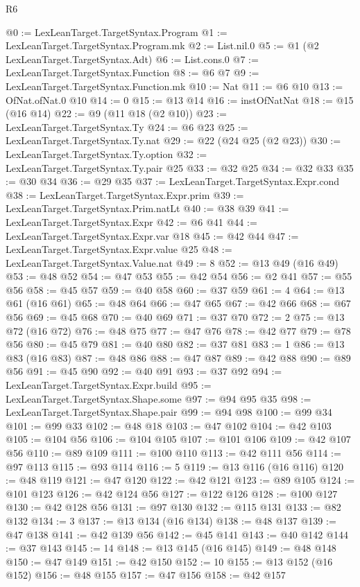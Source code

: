 \begin{lexlean}{R6}
\begin{coremodule}
@0 := LexLeanTarget.TargetSyntax.Program
@1 := LexLeanTarget.TargetSyntax.Program.mk
@2 := List.nil.{0}
@5 := @1 (@2 LexLeanTarget.TargetSyntax.Adt)
@6 := List.cons.{0}
@7 := LexLeanTarget.TargetSyntax.Function
@8 := @6 @7
@9 := LexLeanTarget.TargetSyntax.Function.mk
@10 := Nat
@11 := @6 @10
@13 := OfNat.ofNat.{0} @10
@14 := 0
@15 := @13 @14
@16 := instOfNatNat
@18 := @15 (@16 @14)
@22 := @9 (@11 @18 (@2 @10))
@23 := LexLeanTarget.TargetSyntax.Ty
@24 := @6 @23
@25 := LexLeanTarget.TargetSyntax.Ty.nat
@29 := @22 (@24 @25 (@2 @23))
@30 := LexLeanTarget.TargetSyntax.Ty.option
@32 := LexLeanTarget.TargetSyntax.Ty.pair @25
@33 := @32 @25
@34 := @32 @33
@35 := @30 @34
@36 := @29 @35
@37 := LexLeanTarget.TargetSyntax.Expr.cond
@38 := LexLeanTarget.TargetSyntax.Expr.prim
@39 := LexLeanTarget.TargetSyntax.Prim.natLt
@40 := @38 @39
@41 := LexLeanTarget.TargetSyntax.Expr
@42 := @6 @41
@44 := LexLeanTarget.TargetSyntax.Expr.var @18
@45 := @42 @44
@47 := LexLeanTarget.TargetSyntax.Expr.value @25
@48 := LexLeanTarget.TargetSyntax.Value.nat
@49 := 8
@52 := @13 @49 (@16 @49)
@53 := @48 @52
@54 := @47 @53
@55 := @42 @54
@56 := @2 @41
@57 := @55 @56
@58 := @45 @57
@59 := @40 @58
@60 := @37 @59
@61 := 4
@64 := @13 @61 (@16 @61)
@65 := @48 @64
@66 := @47 @65
@67 := @42 @66
@68 := @67 @56
@69 := @45 @68
@70 := @40 @69
@71 := @37 @70
@72 := 2
@75 := @13 @72 (@16 @72)
@76 := @48 @75
@77 := @47 @76
@78 := @42 @77
@79 := @78 @56
@80 := @45 @79
@81 := @40 @80
@82 := @37 @81
@83 := 1
@86 := @13 @83 (@16 @83)
@87 := @48 @86
@88 := @47 @87
@89 := @42 @88
@90 := @89 @56
@91 := @45 @90
@92 := @40 @91
@93 := @37 @92
@94 := LexLeanTarget.TargetSyntax.Expr.build
@95 := LexLeanTarget.TargetSyntax.Shape.some
@97 := @94 @95 @35
@98 := LexLeanTarget.TargetSyntax.Shape.pair
@99 := @94 @98
@100 := @99 @34
@101 := @99 @33
@102 := @48 @18
@103 := @47 @102
@104 := @42 @103
@105 := @104 @56
@106 := @104 @105
@107 := @101 @106
@109 := @42 @107 @56
@110 := @89 @109
@111 := @100 @110
@113 := @42 @111 @56
@114 := @97 @113
@115 := @93 @114
@116 := 5
@119 := @13 @116 (@16 @116)
@120 := @48 @119
@121 := @47 @120
@122 := @42 @121
@123 := @89 @105
@124 := @101 @123
@126 := @42 @124 @56
@127 := @122 @126
@128 := @100 @127
@130 := @42 @128 @56
@131 := @97 @130
@132 := @115 @131
@133 := @82 @132
@134 := 3
@137 := @13 @134 (@16 @134)
@138 := @48 @137
@139 := @47 @138
@141 := @42 @139 @56
@142 := @45 @141
@143 := @40 @142
@144 := @37 @143
@145 := 14
@148 := @13 @145 (@16 @145)
@149 := @48 @148
@150 := @47 @149
@151 := @42 @150
@152 := 10
@155 := @13 @152 (@16 @152)
@156 := @48 @155
@157 := @47 @156
@158 := @42 @157

\end{coremodule}
\end{lexlean}
